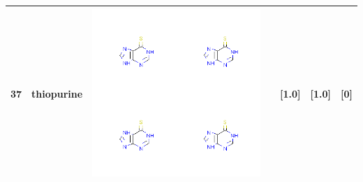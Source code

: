 \begin{longtable}{|l|l|l|l|l|l|l|}
\hline
37 & thiopurine & \includegraphics[scale=0.6]{thiopurineMV.png} & & [1.0]& [1.0] & [0] \\
\hline
\end{longtable}